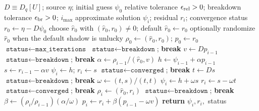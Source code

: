 \documentclass[UTF8,12pt,a4paper,twoside,openany]{ctexbook}
\begin{document}
\begin{algorithm}[htbp]
\footnotesize
\linespread{0.95}\selectfont
\caption{Unpreconditioned BiCGSTAB for the lattice Dirac equation \(D[U]\psi=\eta\)}
\label{alg:bicgstab}
\begin{algorithmic}[1]
\Require \(D\equiv D_q[U]\); source \(\eta\); initial guess \(\psi_0\)
\Require relative tolerance \(\epsilon_{\rm rel}>0\); breakdown tolerance \(\epsilon_{\rm br}>0\); \(i_{\max}\)
\Ensure approximate solution \(\psi_i\); residual \(r_i\); convergence status
\State \(r_0\gets \eta-D\psi_0\)
\State choose \(\hat r_0\) with \((\hat r_0,r_0)\ne0\); default \(\hat r_0\gets r_0\)
\State optionally randomize \(\hat r_0\) when the default shadow is unlucky
\State \(\rho_0\gets(\hat r_0,r_0)\); \(p_0\gets r_0\)
\State \(\texttt{status}\gets\texttt{max\_iterations}\)
  \State \(\texttt{status}\gets\texttt{breakdown}\); \textbf{break}
\EndIf
{}
  \State \(v\gets Dp_{i-1}\)
    \State \(\texttt{status}\gets\texttt{breakdown}\); \textbf{break}
  \EndIf
  \State \(\alpha\gets\rho_{i-1}/(\hat r_0,v)\)
  \State \(h\gets\psi_{i-1}+\alpha p_{i-1}\)
  \State \(s\gets r_{i-1}-\alpha v\)
    \State \(\psi_i\gets h\); \(r_i\gets s\)
    \State \(\texttt{status}\gets\texttt{converged}\); \textbf{break}
  \EndIf
  \State \(t\gets Ds\)
    \State \(\texttt{status}\gets\texttt{breakdown}\); \textbf{break}
  \EndIf
  \State \(\omega\gets(t,s)/(t,t)\)
  \State \(\psi_i\gets h+\omega s\)
  \State \(r_i\gets s-\omega t\)
    \State \(\texttt{status}\gets\texttt{converged}\); \textbf{break}
  \EndIf
  \State \(\rho_i\gets(\hat r_0,r_i)\)
    \State \(\texttt{status}\gets\texttt{breakdown}\); \textbf{break}
  \EndIf
  \State \(\beta\gets(\rho_i/\rho_{i-1})(\alpha/\omega)\)
  \State \(p_i\gets r_i+\beta(p_{i-1}-\omega v)\)
\EndFor
\State \textbf{return} \(\psi_i,r_i,\) status
\end{algorithmic}
\end{algorithm}
\end{document}
